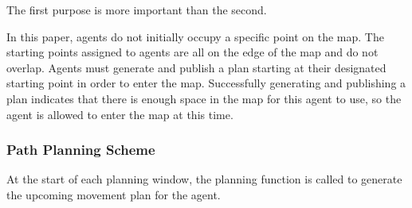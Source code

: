 The first purpose is more important than the second.

In this paper, agents do not initially occupy a specific point on the map. The starting points assigned to agents are all on the edge of the map and do not overlap. Agents must generate and publish a plan starting at their designated starting point in order to enter the map.
Successfully generating and publishing a plan indicates that there is enough space in the map for this agent to use, so the agent is allowed to enter the map at this time.


\subsubsection{Path Planning Scheme}

At the start of each planning window, the planning function is called to generate the upcoming movement plan for the agent.

